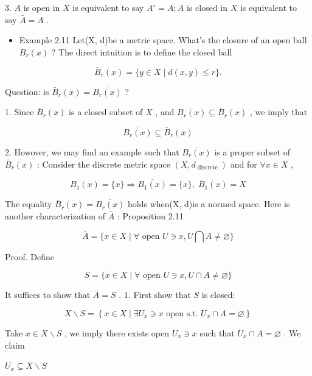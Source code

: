 3. \(A\) is open in \(X\) is equivalent to say \({A}^{ \circ  } = A;A\) is closed in \(X\) is equivalent to say \(\bar{A} = A\) .

\begin{itemize}
\item Example 2.11 Let(X, d)be a metric space. What’s the closure of an open ball \({B}_{r}\left( x\right)\) ? The direct intuition is to define the closed ball
\end{itemize}

\[
{\bar{B}}_{r}\left( x\right)  = \{ y \in  X \mid  d\left( {x,y}\right)  \leq  r\} .
\]

Question: is \({\bar{B}}_{r}\left( x\right)  = \overline{{B}_{r}\left( x\right) }\) ?

1. Since \({\bar{B}}_{r}\left( x\right)\) is a closed subset of \(X\) , and \({B}_{r}\left( x\right)  \subseteq  {\bar{B}}_{r}\left( x\right)\) , we imply that

\[
\overline{{B}_{r}\left( x\right) } \subseteq  {\bar{B}}_{r}\left( x\right)
\]

2. Howover, we may find an example such that \(\overline{{B}_{r}\left( x\right) }\) is a proper subset of \({\bar{B}}_{r}\left( x\right)\) : Consider the discrete metric space \(\left( {X,{d}_{\text{ discrete }}}\right)\) and for \(\forall x \in  X\) ,

\[
{B}_{1}\left( x\right)  = \{ x\}  \Rightarrow  \overline{{B}_{1}\left( x\right) } = \{ x\} ,\;{\bar{B}}_{1}\left( x\right)  = X
\]

The equality \({\bar{B}}_{r}\left( x\right)  = \overline{{B}_{r}\left( x\right) }\) holds when(X, d)is a normed space. Here is another characterization of \(\bar{A}\) : Proposition 2.11

\[
\bar{A} = \{ x \in  X \mid  \forall \text{ open }U \ni  x,U\bigcap A \neq  \varnothing \}
\]

Proof. Define

\[
S = \{ x \in  X \mid  \forall \text{ open }U \ni  x,U \cap  A \neq  \varnothing \}
\]

It suffices to show that \(\bar{A} = S\) . 1. First show that \(S\) is closed:

\[
X \smallsetminus  S = \left\{  {x \in  X\mid \exists {U}_{x} \ni  x\text{ open s.t. }{U}_{x} \cap  A = \varnothing }\right\}
\]

Take \(x \in  X \smallsetminus  S\) , we imply there exists open \({U}_{x} \ni  x\) such that \({U}_{x} \cap  A = \varnothing\) . We claim

\({U}_{x} \subseteq  X \smallsetminus  S\)

